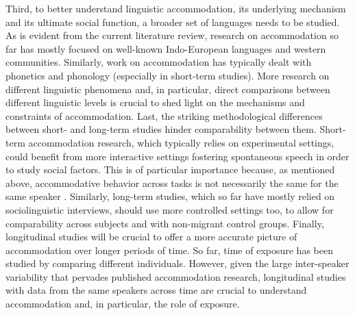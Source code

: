 \documentclass[output=paper,
modfonts
]{langscibook}
\begin{document}
% 
% 
% 
% 
Third, to better understand linguistic accommodation, its underlying mechanism and its ultimate social function, a broader set of languages needs to be studied. As is evident from the current literature review, research on accommodation so far has mostly focused on well-known Indo-European languages and western communities. Similarly, work on accommodation has typically dealt with phonetics and phonology (especially in short-term studies). More research on different linguistic phenomena and, in particular, direct comparisons between different linguistic levels is crucial to shed light on the mechanisms and constraints of accommodation.
% 
% 
% 
%
Last, the striking methodological differences between short- and long-term studies hinder comparability between them. Short-term accommodation research, which typically relies on experimental settings, could benefit from more interactive settings fostering spontaneous speech in order to study social factors. This is of particular importance because, as mentioned above, accommodative behavior across tasks is not necessarily the same for the same speaker \citep{pardo_comparison_2018}. Similarly, long-term studies, which so far have mostly relied on sociolinguistic interviews, should use more controlled settings too, to allow for comparability across subjects and  with non-migrant control groups. Finally, longitudinal studies will be crucial to offer a more accurate picture of accommodation over longer periods of time. So far, time of exposure has been studied by comparing different individuals. However, given the large inter-speaker variability that pervades published accommodation research, longitudinal studies with data from the same speakers across time are crucial to understand accommodation and, in particular, the role of exposure.
% 
\end{document}
